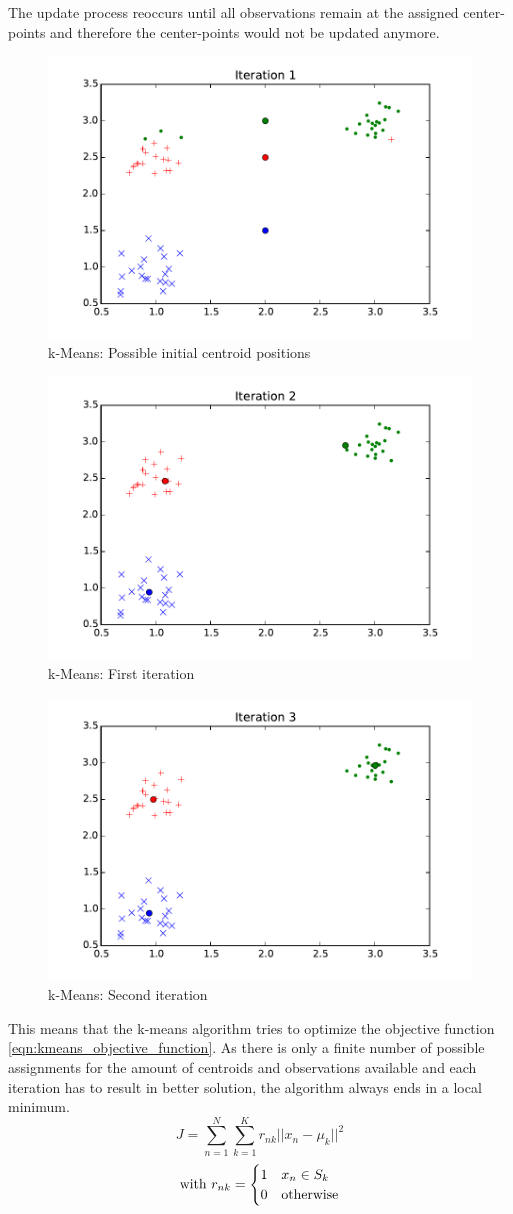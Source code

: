The update process reoccurs until all observations remain at the assigned center-points and therefore the center-points would not be updated anymore.


\begin{figure}
\centering
\includegraphics[width=0.4\linewidth]{img/iteration01}
\caption{k-Means: Possible initial centroid positions}
\label{fig:kmeans:iteration01}
\end{figure}

\begin{figure}
\centering
\includegraphics[width=0.4\linewidth]{img/iteration02}
\caption{k-Means: First iteration}
\label{fig:kmeans:iteration02}
\end{figure}

\begin{figure}
\centering
\includegraphics[width=0.4\linewidth]{img/iteration03}
\caption{k-Means: Second iteration}
\label{fig:kmeans:iteration03}
\end{figure}


This means that the k-means algorithm tries to optimize the objective function \ref{eqn:kmeans_objective_function}. As there is only a finite number of possible assignments for the amount of centroids and observations available and each iteration has to result in better solution, the algorithm always ends in a local minimum.
\begin{equation}
J = \sum_{n=1}^{N} \sum_{k=1}^{K} r_{nk} ||x_n - \mu_k||^2
\label{eqn:kmeans_objective_function}
\end{equation}
\[
\text{with } \\
r_{nk} = \begin{cases}
1 & x_n \in S_k \\
0 & \text{otherwise}
\end{cases}
\]

